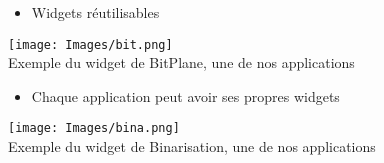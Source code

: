\begin{frame}
	\begin{itemize}
		\item Widgets réutilisables
	\end{itemize}
	\begin{center}
		\texttt{[image: Images/bit.png]}\\
		\scriptsize Exemple du widget de BitPlane, une de nos applications
	\end{center}
\end{frame}
	
\begin{frame}
	\begin{itemize}
		\item Chaque application peut avoir ses propres widgets
	\end{itemize}
	\begin{center}
		\texttt{[image: Images/bina.png]}\\
		\scriptsize Exemple du widget de Binarisation, une de nos applications
	\end{center}
\end{frame}
